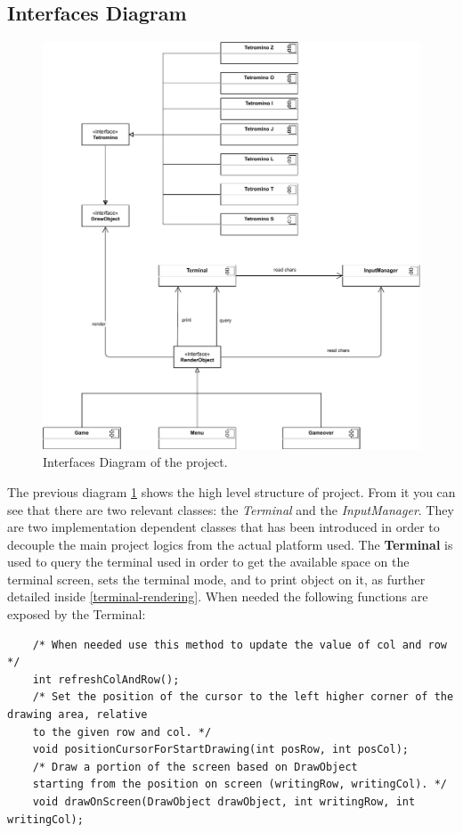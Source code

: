 \documentclass{article}
\begin{document}
\subsection{Interfaces Diagram}
\begin{figure}[H]
    \centering
    \includegraphics[width=\linewidth]{img/InterafcesDiagram.pdf}
    \caption{Interfaces Diagram of the project.}
    \label{fig:interface}
\end{figure}
The previous diagram \ref{fig:interface} shows the high level structure of project. From it you can see that there are two relevant classes: the \textit{Terminal} and the \textit{InputManager}.
They are two implementation dependent classes that has been introduced in order to decouple the main project logics from the actual platform used.
The \textbf{Terminal} is used to query the terminal used in order to get the available space on the terminal screen, sets the terminal mode, and to print object on it, as further detailed inside \ref{terminal-rendering}.
When needed the following functions are exposed by the Terminal:
\begin{verbatim}
    /* When needed use this method to update the value of col and row */
    int refreshColAndRow();
    /* Set the position of the cursor to the left higher corner of the drawing area, relative
    to the given row and col. */
    void positionCursorForStartDrawing(int posRow, int posCol);
    /* Draw a portion of the screen based on DrawObject
    starting from the position on screen (writingRow, writingCol). */
    void drawOnScreen(DrawObject drawObject, int writingRow, int writingCol);
\end{verbatim}
\end{document}
